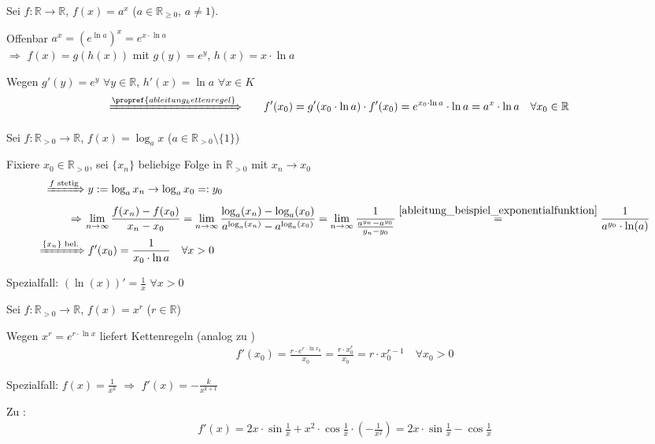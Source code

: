 \begin{example}
	Sei $f:\mathbb{R}\to \mathbb{R}$, $f(x) = a^x$ ($a\in\mathbb{R}_{\ge 0}$, $a\neq 1$).
	
	Offenbar $a^x = \left(e^{\ln a}\right)^x = e^{x\cdot \ln a}$\\
	$\Rightarrow$ $f(x) = g(h(x))$ mit $g(y) = e^y$, $h(x) = x\cdot \ln a$
	
	Wegen $g'(y) = e^y$ $\forall y\in\mathbb{R}$, $h'(x) = \ln a$ $\forall x\in K$ \\[\dimexpr -\baselineskip / 2 \relax]
	\zeroAmsmathAlignVSpaces \begin{alignat*}{2}
	\xRightarrow{\propref{ableitung_kettenregel}}\quad&& f'(x_0) &= g'(x_0\cdot \ln a)\cdot f'(x_0) = e^{x_0\cdot \ln a}\cdot \ln a = a^x\cdot \ln a \quad\forall x_0\in\mathbb{R}
	\end{alignat*}
\end{example}

\begin{example}
	Sei $f:\mathbb{R}_{>0} \to \mathbb{R}$, $f(x) = \log_a x$ ($a\in\mathbb{R}_{>0}\setminus\{1\}$)
	
	Fixiere $x_0\in \mathbb{R}_{>0}$, sei $\{x_n\}$ beliebige Folge in $\mathbb{R}_{>0}$ mit $x_n\to x_0$
	\zeroAmsmathAlignVSpaces*[5pt] \begin{alignat*}{1}
		\xRightarrow{\text{$f$ stetig}}\;& y:= \log_a x_n \to \log_a x_0 =: y_0 \\
		\Rightarrow\;\;&\!\! \lim\limits_{n\to \infty} \frac{f(x_n) - f(x_0)}{x_n - x_0} = \lim\limits_{n\to \infty} \frac{\log_a(x_n) - \log_a(x_0)}{a^{\log_a(x_n)} - a^{\log_a(x_0)}} = \lim\limits_{n\to \infty} \dfrac{1}{\frac{a^{y_n} - a^{y_0}}{y_n - y_0}} \overset{\ref{ableitung_beispiel_exponentialfunktion}}{=}{\frac{1}{a^{y_0}\cdot \ln(a)}} \\
		\xRightarrow{\{x_n\}\text{ bel.}}\;& f'(x_0) = \frac{1}{x_0\cdot \ln a}\quad\forall x>0
	\end{alignat*}
	
	Spezialfall: $(\ln(x))' = \frac{1}{x}$ $\forall x>0$
\end{example}

\begin{example}
	Sei $f:\mathbb{R}_{>0}\to \mathbb{R}$, $f(x) = x^r$ ($r\in\mathbb{R}$)
	
	Wegen $x^r = e^{r\cdot \ln x}$ liefert Kettenregeln (analog zu ) \begin{align*}
		f'(x_0) = \frac{r\cdot e^{r\cdot \ln x_0}}{x_0} = \frac{r\cdot x_0^r}{x_0} = r\cdot x_0^{r - 1} \quad\forall x_0>0
	\end{align*}
	
	Spezialfall: $f(x) = \frac{1}{x^k}$ $\Rightarrow$ $f'(x) = - \frac{k}{x^{k+1}}$
	
	Zu :\begin{align*}
		f'(x) = 2x\cdot \sin\frac{1}{x} + x^2\cdot \cos\frac{1}{x} \cdot \left( - \frac{1}{x^2}\right) = 2x\cdot \sin\frac{1}{x} - \cos\frac{1}{x}
	\end{align*}
\end{example}

